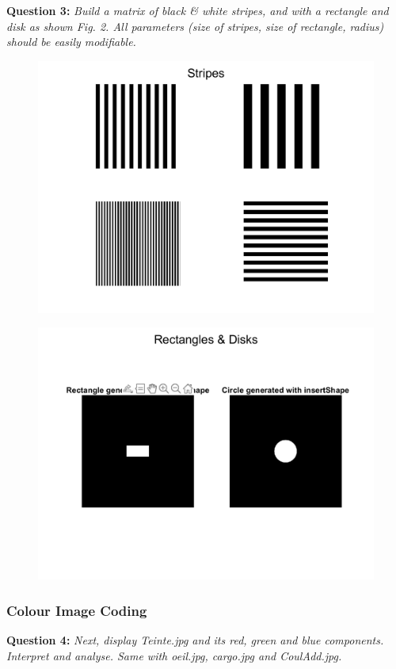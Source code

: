 \textbf{Question 3:}
\textit{Build a matrix of black \& white stripes, and with a rectangle and disk as shown Fig. 2. All parameters (size of stripes, size of rectangle, radius) should be easily modiﬁable.}

\begin{figure}[H]
    \centering
    \includegraphics[width=0.75\linewidth]{Doc/Graphics/Part1_Question3a.png}
    \label{fig:enter-label}
\end{figure}

\begin{figure}[H]
    \centering
    \includegraphics[width=0.5\linewidth]{Doc/Graphics/Part1_Question3b.png}
    \label{fig:enter-label}
\end{figure}



\subsubsection{Colour Image Coding}
\textbf{Question 4:}
\textit{Next, display Teinte.jpg and its red, green and blue components. Interpret and analyse. Same with oeil.jpg, cargo.jpg and CoulAdd.jpg.}

